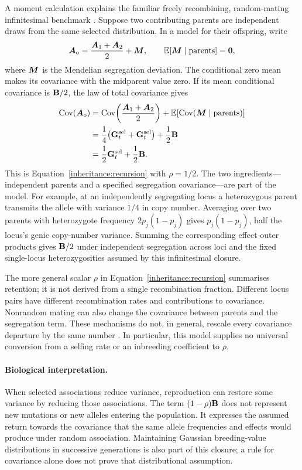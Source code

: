 A moment calculation explains the familiar freely recombining,
random-mating infinitesimal benchmark \citep{Bulmer1971}. Suppose two
contributing parents are independent draws from the same selected
distribution. In a model for their offspring, write
\begin{equation}
  \boldsymbol{A}_{\mathrm{o}}
      =\frac{\boldsymbol{A}_1+\boldsymbol{A}_2}{2}+\boldsymbol{M},
  \qquad
  \mathbb E[\boldsymbol{M}\mid\text{parents}]=\boldsymbol{0},
  \label{inheritance:mendelian-decomposition}
\end{equation}
where $\boldsymbol{M}$ is the Mendelian segregation deviation. The conditional
zero mean makes its covariance with the midparent value zero. If its
mean conditional covariance is $\mathbf{B}/2$, the law of total covariance
gives
\begin{align}
  \operatorname{Cov}(\boldsymbol{A}_{\mathrm{o}})
     &=\operatorname{Cov}\!\left(\frac{\boldsymbol{A}_1+\boldsymbol{A}_2}{2}\right)
          +\mathbb E[\operatorname{Cov}(\boldsymbol{M}\mid\text{parents})]\\
     &=\frac14\bigl(\mathbf{G}_t^{\mathrm{sel}}
                         +\mathbf{G}_t^{\mathrm{sel}}\bigr)+\frac12\mathbf{B}\\
     &=\frac12\mathbf{G}_t^{\mathrm{sel}}+\frac12\mathbf{B}.
  \label{inheritance:half-reproduction}
\end{align}
This is Equation~\eqref{inheritance:recursion} with $\rho=1/2$.
The two ingredients---independent parents and a specified segregation
covariance---are part of the model. For example, at an independently
segregating locus a heterozygous parent transmits the allele with variance
$1/4$ in copy number. Averaging over two parents with heterozygote frequency
$2p_j(1-p_j)$ gives $p_j(1-p_j)$, half the locus's genic copy-number
variance. Summing the corresponding effect outer products gives
$\mathbf{B}/2$ under independent segregation across loci and the fixed
single-locus heterozygosities assumed by this infinitesimal closure.

The more general scalar $\rho$ in Equation~\eqref{inheritance:recursion}
summarises retention; it is not derived from a single recombination fraction.
Different locus pairs have different recombination rates and contributions
to covariance. Nonrandom mating can also change the covariance between
parents and the segregation term. These mechanisms do not, in general,
rescale every covariance departure by the same number
\citep{Bulmer1974,BartonTurelli1991}. In particular, this model supplies no
universal conversion from a selfing rate or an inbreeding coefficient to
$\rho$.

\paragraph{Biological interpretation.}
When selected associations reduce variance, reproduction can restore some
variance by reducing those associations. The term $(1-\rho)\mathbf{B}$ does not
represent new mutations or new alleles entering the population. It expresses
the assumed return towards the covariance that the same allele frequencies
and effects would produce under random association. Maintaining Gaussian
breeding-value distributions in successive generations is also part of this
closure; a rule for covariance alone does not prove that distributional
assumption.

